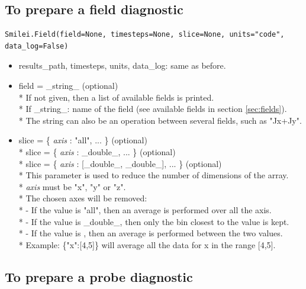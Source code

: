 \documentclass[11pt]{article}
\newcommand{\code}[1]{\colorbox{yellow!15}{\ttfamily #1}}
\newcommand{\val}[1]{{\ttfamily \textit{#1}}}
\begin{document}
\subsection{To prepare a field diagnostic}

\begin{lstlisting}
Smilei.Field(field=None, timesteps=None, slice=None, units="code", data_log=False)
\end{lstlisting}

\begin{itemize}
\item \code{results\_path}, \code{timesteps}, \code{units}, \code{data\_log}: same as before.
\item \code{field} = \code{\_string\_} (optional)\\*
	If not given, then a list of available fields is printed.\\*
	If \code{\_string\_}: name of the field (see available fields in section \ref{sec:fields}).\\*
	The string can also be an operation between several fields, such as \code{"Jx+Jy"}.
\item \code{slice} = \code{\{ \val{axis} : "all", ... \}}                 (optional)\\*
	\code{slice} = \code{\{ \val{axis} : \_double\_, ... \}}              (optional)\\*
	\code{slice} = \code{\{ \val{axis} : [\_double\_, \_double\_], ... \}}  (optional)\\*
	This parameter is used to reduce the number of dimensions of the array.\\*
	\val{axis} must be \code{"x"}, \code{"y"} or \code{"z"}.\\*
	 The chosen axes will be removed:\\*
	- If the value is \code{"all"}, then an average is performed over all the axis.\\*
	- If the value is \code{\_double\_}, then only the bin closest to the value is kept.\\*
	- If the value is \code{[\_double\_,\_double\_]}, then an average is performed between the two values.\\*
	Example: \code{\{"x":[4,5]\}} will average all the data for x in the range [4,5].
\end{itemize}
\vspace{0.5cm}


\subsection{To prepare a probe diagnostic}
\end{document}
